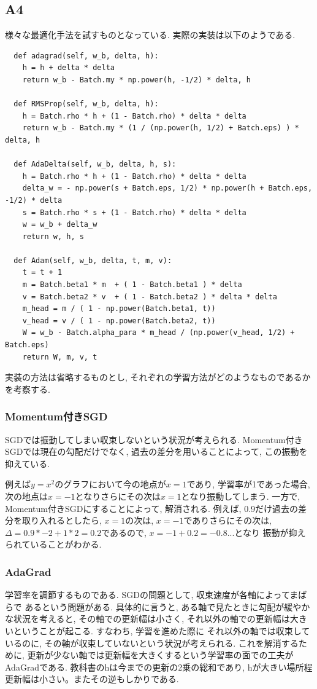 \documentclass[a4paper,11pt]{jsarticle}
\begin{document}
\subsection{A4}
様々な最適化手法を試すものとなっている. 実際の実装は以下のようである.
\begin{lstlisting}
  def adagrad(self, w_b, delta, h):
    h = h + delta * delta
    return w_b - Batch.my * np.power(h, -1/2) * delta, h

  def RMSProp(self, w_b, delta, h):
    h = Batch.rho * h + (1 - Batch.rho) * delta * delta
    return w_b - Batch.my * (1 / (np.power(h, 1/2) + Batch.eps) ) * delta, h

  def AdaDelta(self, w_b, delta, h, s):
    h = Batch.rho * h + (1 - Batch.rho) * delta * delta
    delta_w = - np.power(s + Batch.eps, 1/2) * np.power(h + Batch.eps, -1/2) * delta
    s = Batch.rho * s + (1 - Batch.rho) * delta * delta
    w = w_b + delta_w
    return w, h, s

  def Adam(self, w_b, delta, t, m, v):
    t = t + 1
    m = Batch.beta1 * m  + ( 1 - Batch.beta1 ) * delta
    v = Batch.beta2 * v  + ( 1 - Batch.beta2 ) * delta * delta
    m_head = m / ( 1 - np.power(Batch.beta1, t))
    v_head = v / ( 1 - np.power(Batch.beta2, t))
    W = w_b - Batch.alpha_para * m_head / (np.power(v_head, 1/2) + Batch.eps)
    return W, m, v, t
\end{lstlisting}
実装の方法は省略するものとし, それぞれの学習方法がどのようなものであるかを考察する.

\subsubsection*{Momentum付きSGD}
SGDでは振動してしまい収束しないという状況が考えられる.
Momentum付きSGDでは現在の勾配だけでなく, 過去の差分を用いることによって,
この振動を抑えている.

例えば$ y = x^2 $のグラフにおいて今の地点が$x = 1$であり, 学習率が1であった場合, 
次の地点は$x = -1$となりさらにその次は$x = 1$となり振動してしまう.
一方で, Momentum付きSGDにすることによって, 解消される. 例えば, 0.9だけ過去の差分を取り入れるとしたら, 
$x = 1$の次は, $x = - 1$でありさらにその次は, $\Delta = 0.9 * -2 + 1 * 2 = 0.2$であるので, $x = -1 + 0.2 = -0.8$...となり
振動が抑えられていることがわかる.
\subsubsection*{AdaGrad}
学習率を調節するものである. SGDの問題として, 収束速度が各軸によってまばらで
あるという問題がある. 具体的に言うと, ある軸で見たときに勾配が緩やかな状況を考えると, 
その軸での更新幅は小さく, それ以外の軸での更新幅は大きいということが起こる. すなわち, 学習を進めた際に
それ以外の軸では収束しているのに, その軸が収束していないという状況が考えられる.
これを解消するために, 更新が少ない軸では更新幅を大きくするという学習率の面での工夫がAdaGradである.
教科書のhは今までの更新の2乗の総和であり, hが大きい場所程更新幅は小さい。またその逆もしかりである.
\end{document}
